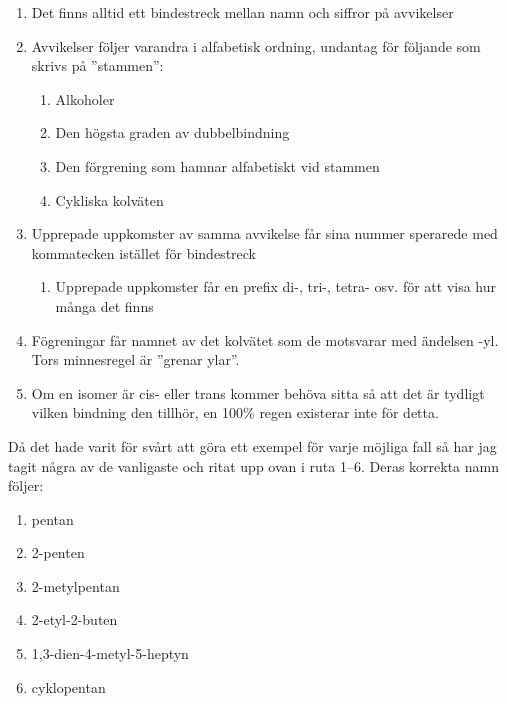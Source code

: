\begin{enumerate}
    \item Det finns alltid ett bindestreck mellan namn och siffror på avvikelser
    \item Avvikelser följer varandra i alfabetisk ordning, undantag för följande som skrivs på ''stammen'':
    \begin{enumerate}
        \item Alkoholer
        \item Den högsta graden av dubbelbindning
        \item Den förgrening som hamnar alfabetiskt vid stammen
        \item Cykliska kolväten
    \end{enumerate}
    \item Upprepade uppkomster av samma avvikelse får sina nummer sperarede med kommatecken istället för bindestreck
    \begin{enumerate}
        \item Upprepade uppkomster får en prefix di-, tri-, tetra- osv. för att visa hur många det finns
    \end{enumerate}
    \item Fögreningar får namnet av det kolvätet som de motsvarar med ändelsen -yl. Tors minnesregel är ''grenar ylar''.
    \item Om en isomer är cis- eller trans kommer behöva sitta så att det är  tydligt vilken bindning den tillhör, en 100\% regen existerar inte för detta.
\end{enumerate}
Då det hade varit för svårt att göra ett exempel för varje möjliga fall så har jag tagit några av de vanligaste och ritat upp ovan i ruta 1--6. Deras korrekta namn följer:
\begin{enumerate}
    \item pentan
    \item 2-penten
    \item 2-metylpentan
    \item 2-etyl-2-buten
    \item 1,3-dien-4-metyl-5-heptyn
    \item cyklopentan
\end{enumerate}


